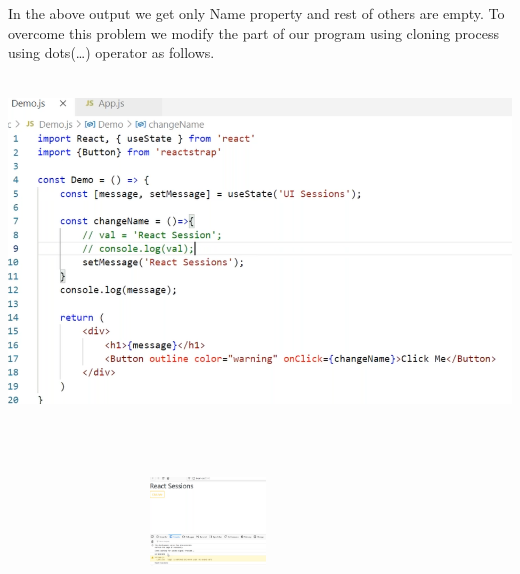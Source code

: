 \documentclass{article}
\begin{document}
\noindent 
\newpage
\noindent In the above output we get only Name property and rest of others are empty.  To overcome this problem we modify the part of our program using cloning process using dots({\dots}) operator as follows. \\


\begin{center}
	\noindent \includegraphics*[width=6.17in, height=3.63in]{IMG-10-12}
\end{center}

\noindent 

\noindent 

\noindent \\


\begin{flushleft}
	\noindent \includegraphics*[width=4.17in, height=0.92in]{IMG-10-13}
\end{flushleft}
\end{document}
